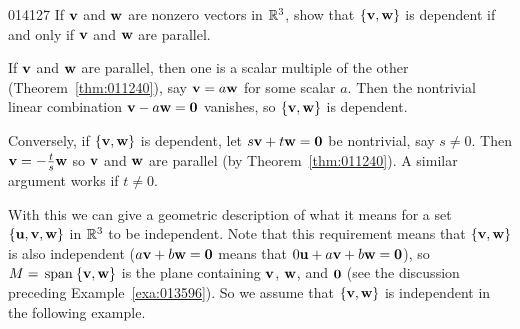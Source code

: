 \begin{example}{}{014127}
If $\textbf{v}$ and $\textbf{w}$ are nonzero vectors in $\mathbb{R}^3$, show that $\{\textbf{v}, \textbf{w}\}$ is dependent if and only if $\textbf{v}$ and $\textbf{w}$ are parallel.

\begin{solution}
If $\textbf{v}$ and $\textbf{w}$ are parallel, then one is a scalar multiple of the other (Theorem~\ref{thm:011240}), say $\textbf{v} = a\textbf{w}$ for some scalar $a$. Then the nontrivial linear combination $\textbf{v} - a\textbf{w} = \textbf{0}$ vanishes, so $\{\textbf{v}, \textbf{w}\}$ is dependent.

Conversely, if $\{\textbf{v}, \textbf{w}\}$ is dependent, let $s\textbf{v} + t\textbf{w} = \textbf{0}$ be nontrivial, say $s \neq 0$. Then $\textbf{v} = -\tfrac{t}{s}\textbf{w}$ so $\textbf{v}$ and $\textbf{w}$ are parallel (by Theorem~\ref{thm:011240}). A similar argument works if $t \neq 0$.
\end{solution}
\end{example}

With this we can give a geometric description of what it means for a set $\{\textbf{u}, \textbf{v}, \textbf{w}\}$ in $\mathbb{R}^3$ to be independent. Note that this requirement means that $\{\textbf{v}, \textbf{w}\}$ is also independent ($a\textbf{v} + b\textbf{w} = \textbf{0}$ means that $0\textbf{u} + a\textbf{v} + b\textbf{w} = \textbf{0}$), so $M = \thinspace\operatorname{span\medspace}\{\textbf{v}, \textbf{w}\}$ is the plane containing $\textbf{v}$, $\textbf{w}$, and $\textbf{0}$ (see the discussion preceding Example~\ref{exa:013596}). So we assume that $\{\textbf{v}, \textbf{w}\}$ is independent in the following example.

